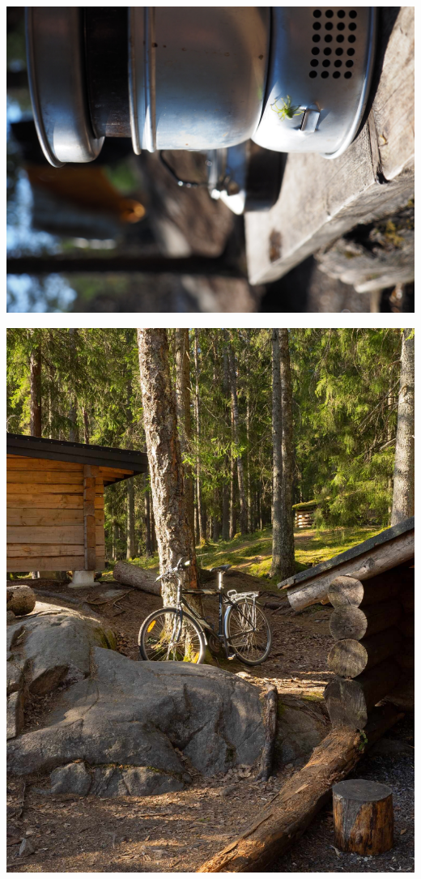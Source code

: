 \begin{multicols}{2}
	\begin{center}
		\noindent\includegraphics[height=0.36\paperheight]{assets/pyörävaellus17}
	\end{center}
	\columnbreak
	\begin{Figure}
		\noindent\includegraphics[height=0.36\paperheight]{assets/pyörävaellus18}
	\end{Figure}
\end{multicols}


